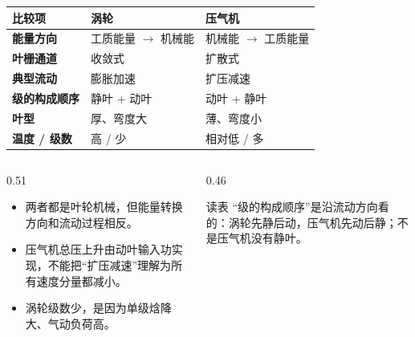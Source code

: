 \begin{frame}[t,shrink]{}
\begin{smalltab}
\begin{tabularx}{\linewidth}{@{}>{\bfseries}p{25mm}XX@{}}
  \toprule
  比较项 & 涡轮 & 压气机\\
  \midrule
  能量方向 & 工质能量 $\rightarrow$ 机械能 & 机械能 $\rightarrow$ 工质能量\\
  叶栅通道 & 收敛式 & 扩散式\\
  典型流动 & 膨胀加速 & 扩压减速\\
  级的构成顺序 & 静叶 + 动叶 & 动叶 + 静叶\\
  叶型 & 厚、弯度大 & 薄、弯度小\\
  温度 / 级数 & 高 / 少 & 相对低 / 多\\
  \bottomrule
\end{tabularx}
\end{smalltab}
\begin{columns}[T,onlytextwidth]
\begin{column}{0.51\textwidth}
  \begin{itemize}
    \item 两者都是叶轮机械，但能量转换方向和流动过程相反。
    \item 压气机总压上升由动叶输入功实现，不能把“扩压减速”理解为所有速度分量都减小。
    \item 涡轮级数少，是因为单级焓降大、气动负荷高。
  \end{itemize}
\end{column}
\begin{column}{0.46\textwidth}
  \begin{keybox}{读表}
  \small “级的构成顺序”是沿流动方向看的：涡轮先静后动，压气机先动后静；不是压气机没有静叶。
  \end{keybox}
\end{column}
\end{columns}
\end{frame}

